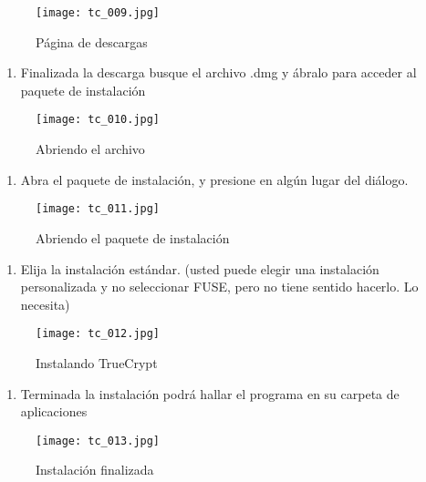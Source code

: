 \documentclass[10pt,a5paper,twoside,,]{book}
\providecommand{\tightlist}{%
  \setlength{\itemsep}{0pt}\setlength{\parskip}{0pt}}
\begin{document}
\begin{figure}[htbp]
\centering
\texttt{[image: tc\_009.jpg]}
\caption{Página de descargas}
\end{figure}

\begin{enumerate}
\def\labelenumi{\arabic{enumi}.}
\setcounter{enumi}{1}
\tightlist
\item
  Finalizada la descarga busque el archivo .dmg y ábralo para acceder al
  paquete de instalación
\end{enumerate}

\begin{figure}[htbp]
\centering
\texttt{[image: tc\_010.jpg]}
\caption{Abriendo el archivo}
\end{figure}

\begin{enumerate}
\def\labelenumi{\arabic{enumi}.}
\setcounter{enumi}{2}
\tightlist
\item
  Abra el paquete de instalación, y presione en algún lugar del diálogo.
\end{enumerate}

\begin{figure}[htbp]
\centering
\texttt{[image: tc\_011.jpg]}
\caption{Abriendo el paquete de instalación}
\end{figure}

\begin{enumerate}
\def\labelenumi{\arabic{enumi}.}
\setcounter{enumi}{3}
\tightlist
\item
  Elija la instalación estándar. (usted puede elegir una instalación
  personalizada y no seleccionar FUSE, pero no tiene sentido hacerlo. Lo
  necesita)
\end{enumerate}

\begin{figure}[htbp]
\centering
\texttt{[image: tc\_012.jpg]}
\caption{Instalando TrueCrypt}
\end{figure}

\begin{enumerate}
\def\labelenumi{\arabic{enumi}.}
\setcounter{enumi}{4}
\tightlist
\item
  Terminada la instalación podrá hallar el programa en su carpeta de
  aplicaciones
\end{enumerate}

\begin{figure}[htbp]
\centering
\texttt{[image: tc\_013.jpg]}
\caption{Instalación finalizada}
\end{figure}
\end{document}
